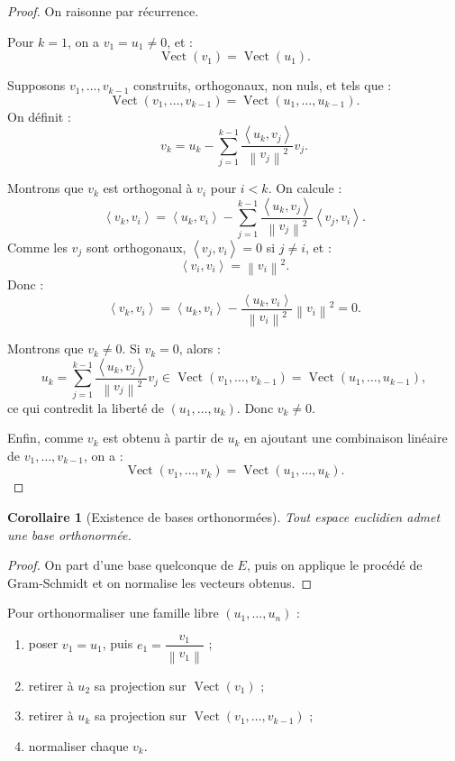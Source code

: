 \documentclass[11pt,a4paper]{article}
\newcommand{\Vect}{\operatorname{Vect}}
\newcommand{\norme}[1]{\left\lVert #1\right\rVert}
\newcommand{\scal}[2]{\left\langle #1,#2\right\rangle}
\newtheorem{corollaire}[prop]{Corollaire}
\begin{document}
\begin{proof}
On raisonne par récurrence.

Pour \(k=1\), on a \(v_1=u_1\neq0\), et :
\[
\Vect(v_1)=\Vect(u_1).
\]

Supposons \(v_1,\dots,v_{k-1}\) construits, orthogonaux, non nuls, et tels que :
\[
\Vect(v_1,\dots,v_{k-1})=\Vect(u_1,\dots,u_{k-1}).
\]
On définit :
\[
v_k
=
u_k
-
\sum_{j=1}^{k-1}
\frac{\scal{u_k}{v_j}}{\norme{v_j}^2}v_j.
\]

Montrons que \(v_k\) est orthogonal à \(v_i\) pour \(i<k\).  
On calcule :
\[
\scal{v_k}{v_i}
=
\scal{u_k}{v_i}
-
\sum_{j=1}^{k-1}
\frac{\scal{u_k}{v_j}}{\norme{v_j}^2}
\scal{v_j}{v_i}.
\]
Comme les \(v_j\) sont orthogonaux, \(\scal{v_j}{v_i}=0\) si \(j\neq i\), et :
\[
\scal{v_i}{v_i}=\norme{v_i}^2.
\]
Donc :
\[
\scal{v_k}{v_i}
=
\scal{u_k}{v_i}
-
\frac{\scal{u_k}{v_i}}{\norme{v_i}^2}
\norme{v_i}^2
=0.
\]

Montrons que \(v_k\neq0\).  
Si \(v_k=0\), alors :
\[
u_k
=
\sum_{j=1}^{k-1}
\frac{\scal{u_k}{v_j}}{\norme{v_j}^2}v_j
\in
\Vect(v_1,\dots,v_{k-1})
=
\Vect(u_1,\dots,u_{k-1}),
\]
ce qui contredit la liberté de \((u_1,\dots,u_k)\).  
Donc \(v_k\neq0\).

Enfin, comme \(v_k\) est obtenu à partir de \(u_k\) en ajoutant une combinaison linéaire de \(v_1,\dots,v_{k-1}\), on a :
\[
\Vect(v_1,\dots,v_k)=\Vect(u_1,\dots,u_k).
\]
\end{proof}

\begin{corollaire}[Existence de bases orthonormées]
Tout espace euclidien admet une base orthonormée.
\end{corollaire}

\begin{proof}
On part d'une base quelconque de \(E\), puis on applique le procédé de Gram-Schmidt et on normalise les vecteurs obtenus.
\end{proof}

\begin{methodbox}
Pour orthonormaliser une famille libre \((u_1,\dots,u_n)\) :
\begin{enumerate}
    \item poser \(v_1=u_1\), puis \(e_1=\dfrac{v_1}{\norme{v_1}}\) ;
    \item retirer à \(u_2\) sa projection sur \(\Vect(v_1)\) ;
    \item retirer à \(u_k\) sa projection sur \(\Vect(v_1,\dots,v_{k-1})\) ;
    \item normaliser chaque \(v_k\).
\end{enumerate}
\end{methodbox}
\end{document}
